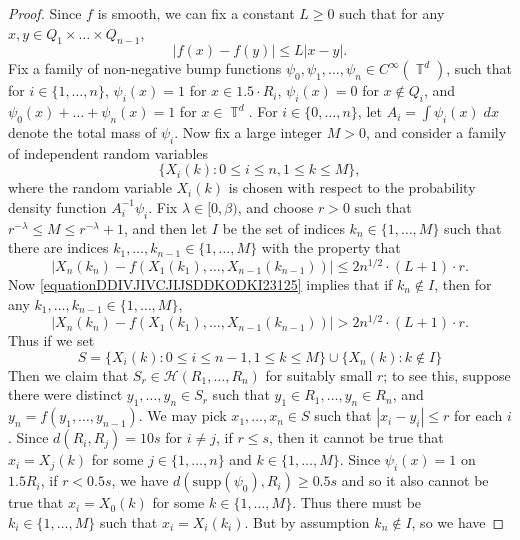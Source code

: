 \documentclass[dvipsnames,letterpaper,12pt]{article}
\numberwithin{equation}{section}
\DeclareMathOperator{\TT}{\mathbb{T}}
\numberwithin{theorem}{section}
\begin{document}
\begin{proof}
    Since $f$ is smooth, we can fix a constant $L \geq 0$ such that for any $x,y \in Q_1 \times \dots \times Q_{n-1}$,
    \begin{equation} \label{eqiatiojawoij2134141235235231}
        |f(x) - f(y)| \leq L|x - y|.
    \end{equation}
    Fix a family of non-negative bump functions $\psi_0,\psi_1,\dots,\psi_n \in C^\infty(\TT^d)$, such that for $i \in \{ 1,\dots,n \}$, $\psi_i(x) = 1$ for $x \in 1.5 \cdot R_i$, $\psi_i(x) = 0$ for $x \not \in Q_i$, and $\psi_0(x) + \dots + \psi_n(x) = 1$ for $x \in \TT^d$. For $i \in \{ 0, \dots, n \}$, let $A_i = \int \psi_i(x)\; dx$ denote the total mass of $\psi_i$. Now fix a large integer $M > 0$, and consider a family of independent random variables
    \[ \{ X_i(k) : 0 \leq i \leq n, 1 \leq k \leq M \}, \]
    where the random variable $X_i(k)$ is chosen with respect to the probability density function $A_i^{-1} \psi_i$. Fix $\lambda \in [0,\beta)$, and choose $r > 0$ such that $r^{-\lambda} \leq M \leq r^{-\lambda} + 1$, and then let $I$ be the set of indices $k_n \in \{ 1, \dots, M \}$ such that there are indices $k_1,\dots,k_{n-1} \in \{ 1,\dots,M \}$ with the property that
    \begin{equation} \label{equationDDIVJIVCJIJSDDKODKI23125}
        |X_n(k_n) - f(X_1(k_1),\dots,X_{n-1}(k_{n-1}))| \leq 2 n^{1/2} \cdot (L+1) \cdot r.
    \end{equation}
    Now \eqref{equationDDIVJIVCJIJSDDKODKI23125} implies that if $k_n \not \in I$, then for any $k_1,\dots,k_{n-1} \in \{ 1, \dots, M \}$,
    \begin{equation}
        |X_n(k_n) - f(X_1(k_1),\dots,X_{n-1}(k_{n-1}))| > 2 n^{1/2} \cdot (L+1) \cdot r.
    \end{equation}
    Thus if we set
    \[ S = \{ X_i(k) : 0 \leq i \leq n-1, 1 \leq k \leq M \} \cup \{ X_n(k) : k \not \in I \} \]
    Then we claim that $S_r \in \mathcal{H}(R_1,\dots,R_n)$ for suitably small $r$; to see this, suppose there were distinct $y_1,\dots,y_n \in S_r$ such that $y_1 \in R_1, \dots, y_n \in R_n$, and $y_n = f(y_1,\dots,y_{n-1})$. We may pick $x_1,\dots,x_n \in S$ such that $|x_i - y_i| \leq r$ for each $i$. Since $d(R_i,R_j) = 10s$ for $i \neq j$, if $r \leq s$, then it cannot be true that $x_i = X_j(k)$ for some $j \in \{ 1, \dots, n \}$ and $k \in \{ 1, \dots, M \}$. Since $\psi_i(x) = 1$ on $1.5 R_i$, if $r < 0.5 s$, we have $d(\text{supp}(\psi_0), R_i) \geq 0.5 s$ and so it also cannot be true that $x_i = X_0(k)$ for some $k \in \{ 1, \dots, M \}$. Thus there must be $k_i \in \{ 1, \dots, M \}$ such that $x_i = X_i(k_i)$. But by assumption $k_n \not \in I$, so we have

\end{proof}
\end{document}
